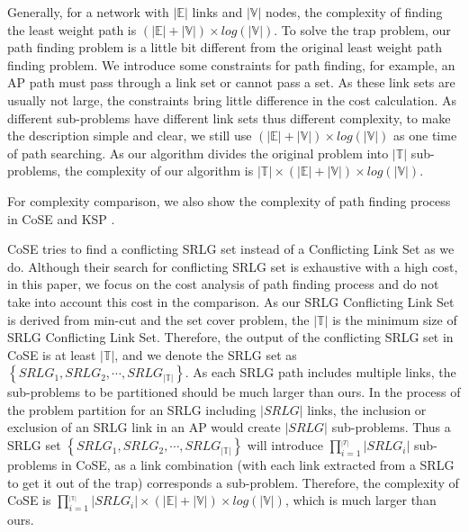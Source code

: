 Generally, for a network with $|\mathbb{E}|$ links and $|\mathbb{V}|$ nodes, the complexity of finding the least weight path is $(|\mathbb{E}|+|\mathbb{V}|)\times log(|\mathbb{V}|)$. To solve the trap problem, our path finding problem is a little bit different from the original least weight path finding problem. We introduce some constraints for path finding, for example, an AP path must pass through a link set or cannot pass a set. As these link sets are usually not large, the constraints bring little  difference in the cost calculation. As different sub-problems have different link sets thus different complexity, to make the description simple and clear, we still use $(|\mathbb{E}|+|\mathbb{V}|)\times log(|\mathbb{V}|)$ as one time of path searching. As our algorithm divides the original problem into $|\mathbb{T}|$ sub-problems, the complexity of our algorithm is $|\mathbb{T}|\times(|\mathbb{E}|+|\mathbb{V}|)\times log(|\mathbb{V}|)$.

For complexity comparison, we also show the complexity of path finding process in  CoSE \cite{rostami2007cose} and KSP \cite{eppstein1998finding}.

CoSE tries to find a conflicting SRLG set instead of a Conflicting Link Set as we do. Although their search for conflicting SRLG set is exhaustive with a high cost, in this paper, we focus on the cost analysis of path finding process and do not take into account this cost in the comparison. As our SRLG Conflicting Link Set is derived from min-cut and the set cover problem, the $|\mathbb{T}|$ is the minimum size of SRLG Conflicting Link Set. Therefore, the output of the conflicting SRLG set in CoSE is at least $|\mathbb{T}|$, and we denote the SRLG set as $\left\{ {SRL{G_1},SRL{G_2}, \cdots ,SRL{G_{|\mathbb{T}|}}} \right\}$. As each SRLG path includes multiple links, the sub-problems to be partitioned should be much larger than ours. In the process of the problem partition for an SRLG including  $|SRLG|$ links, the inclusion or exclusion of an SRLG link in an AP would create  $|SRLG|$ sub-problems.  Thus a SRLG set $\left\{ {SRL{G_1},SRL{G_2}, \cdots ,SRL{G_{|\mathbb{T}|}}} \right\}$ will introduce $\prod\limits_{i = 1}^{_{\left| T \right|}} {\left| {SRL{G_i}} \right|}$ sub-problems in CoSE, as a link  combination (with each link extracted from a SRLG to get it out of the trap) corresponds  a sub-problem. Therefore, the complexity of CoSE  is $\prod\limits_{i = 1}^{_{|\mathbb{T}|}} {\left| {SRL{G_i}} \right|}\times (|\mathbb{E}|+|\mathbb{V}|)\times log(|\mathbb{V}|)$, which is much larger than ours.

